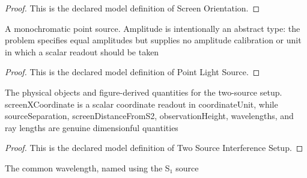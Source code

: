 \begin{proof}
  This is the declared model definition of Screen Orientation.
\end{proof}
\begin{definition}
  \label{def:physics:phyx-mini-0090:phyxminiproblems-problemphyxmini0090-pointlightsource}
  A monochromatic point source. Amplitude is intentionally an abstract type: the problem specifies equal amplitudes but supplies no amplitude calibration or unit in which a scalar readout should be taken
\end{definition}
\begin{proof}
  This is the declared model definition of Point Light Source.
\end{proof}
\begin{definition}
  \label{def:physics:phyx-mini-0090:phyxminiproblems-problemphyxmini0090-twosourceinterferencesetup}
  The physical objects and figure-derived quantities for the two-source setup. screenXCoordinate is a scalar coordinate readout in coordinateUnit, while sourceSeparation, screenDistanceFromS2, observationHeight, wavelengths, and ray lengths are genuine dimensionful quantities
\end{definition}
\begin{proof}
  This is the declared model definition of Two Source Interference Setup.
\end{proof}
\begin{definition}
  \label{def:physics:phyx-mini-0090:phyxminiproblems-problemphyxmini0090-commonwavelength}
  The common wavelength, named using the S₁ source
\end{definition}

